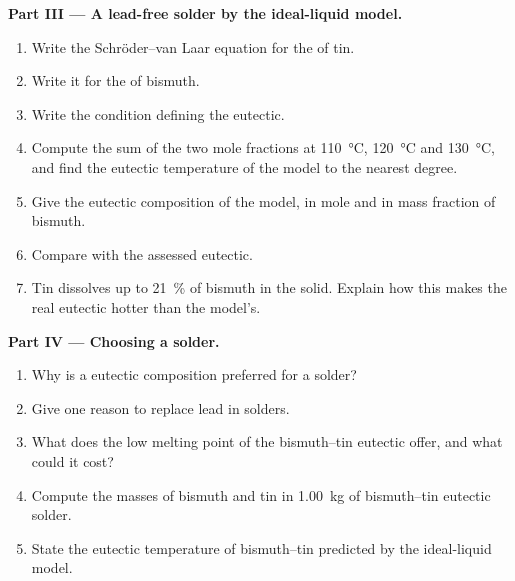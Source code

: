 \begin{problem}
\medskip
\noindent\textbf{Part III --- A lead-free solder by the ideal-liquid model.}
\begin{enumerate}[resume]
  \item Write the Schr\"oder--van Laar equation for the  of tin.
  \item Write it for the  of bismuth.
  \item Write the condition defining the eutectic.
  \item Compute the sum of the two mole fractions at \qty{110}{\degreeCelsius},
        \qty{120}{\degreeCelsius} and \qty{130}{\degreeCelsius}, and find the
        eutectic temperature of the model to the nearest degree.
  \item Give the eutectic composition of the model, in mole and in mass
        fraction of bismuth.
  \item Compare with the assessed eutectic.
  \item Tin dissolves up to 21~\% of bismuth in the solid. Explain how this
        makes the real eutectic hotter than the model's.
\end{enumerate}

\medskip
\noindent\textbf{Part IV --- Choosing a solder.}
\begin{enumerate}[resume]
  \item Why is a eutectic composition preferred for a solder?
  \item Give one reason to replace lead in solders.
  \item What does the low melting point of the bismuth--tin eutectic offer, and
        what could it cost?
  \item Compute the masses of bismuth and tin in \qty{1.00}{kg} of
        bismuth--tin eutectic solder.
  \item State the eutectic temperature of bismuth--tin predicted by the
        ideal-liquid model.
\end{enumerate}
\end{problem}
